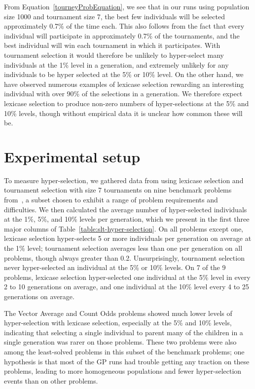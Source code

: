 \documentclass{sig-alternate}
\begin{document}
From Equation~\ref{tourneyProbEquation}, we see that in our runs using population size 1000 and tournament size 7, the best few individuals will be selected approximately 0.7\% of the time each. This also follows from the fact that every individual will participate in approximately 0.7\% of the tournaments, and the best individual will win each tournament in which it participates.
With tournament selection it would therefore be unlikely to hyper-select many individuals at the 1\% level in a generation, and extremely unlikely for any individuals to be hyper selected at the 5\% or 10\% level.
On the other hand, we have observed numerous examples of lexicase selection rewarding an interesting individual with over 90\% of the selections in a generation. We therefore expect lexicase selection to produce non-zero numbers of hyper-selections at the 5\% and 10\% levels, though without empirical data it is unclear how common these will be.

\section{Experimental setup}
\label{section:experiments}


To measure hyper-selection, we gathered data from using lexicase selection and tournament selection with size 7 tournaments on nine benchmark problems from~\cite{Helmuth:2015:GECCO, Helmuth:2015:dissertation}, a subset chosen to exhibit a range of problem requirements and difficulties.
We then calculated the average number of hyper-selected individuals at the 1\%, 5\%, and 10\% levels per generation, which we present in the first three major columns of Table~\ref{table:slt-hyper-selection}. On all problems except one, lexicase selection hyper-selects 5 or more individuals per generation on average at the 1\% level; tournament selection averages less than one per generation on all problems, though always greater than 0.2. Unsurprisingly, tournament selection never hyper-selected an individual at the 5\% or 10\% levels.
On 7 of the 9 problems, lexicase selection hyper-selected one individual at the 5\% level in every 2 to 10 generations on average, and one individual at the 10\% level every 4 to 25 generations on average. 

The Vector Average and Count Odds problems showed much lower levels of hyper-selection with lexicase selection, especially at the 5\% and 10\% levels, indicating that selecting a single individual to parent many of the children in a single generation was rarer on those problems. These two problems were also among the least-solved problems in this subset of the benchmark problems; one hypothesis is that most of the GP runs had trouble getting any traction on these problems, leading to more homogeneous populations and fewer hyper-selection events than on other problems.
\end{document}

